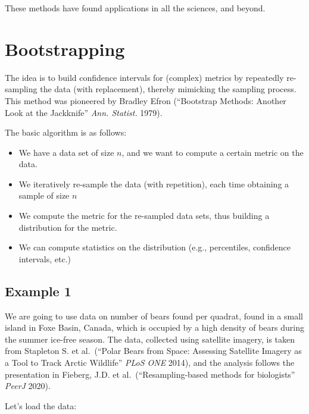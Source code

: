\documentclass[
  letterpaper,
  DIV=11,
  numbers=noendperiod]{scrreprt}
\newenvironment{Shaded}{\begin{snugshade}}{\end{snugshade}}
\newcommand{\NormalTok}[1]{\textcolor[rgb]{0.00,0.23,0.31}{#1}}
\providecommand{\tightlist}{%
  \setlength{\itemsep}{0pt}\setlength{\parskip}{0pt}}\usepackage{longtable,booktabs,array}
\begin{document}
These methods have found applications in all the sciences, and beyond.

\section{Bootstrapping}\label{bootstrapping}

The idea is to build confidence intervals for (complex) metrics by
repeatedly re-sampling the data (with replacement), thereby mimicking
the sampling process. This method was pioneered by Bradley Efron
(``Bootstrap Methods: Another Look at the Jackknife'' \emph{Ann.
Statist.} 1979).

The basic algorithm is as follows:

\begin{itemize}
\tightlist
\item
  We have a data set of size \(n\), and we want to compute a certain
  metric on the data.
\item
  We iteratively re-sample the data (with repetition), each time
  obtaining a sample of size \(n\)
\item
  We compute the metric for the re-sampled data sets, thus building a
  distribution for the metric.
\item
  We can compute statistics on the distribution (e.g., percentiles,
  confidence intervals, etc.)
\end{itemize}

\subsection{Example 1}\label{example-1}

We are going to use data on number of bears found per quadrat, found in
a small island in Foxe Basin, Canada, which is occupied by a high
density of bears during the summer ice-free season. The data, collected
using satellite imagery, is taken from Stapleton S. et al.~(``Polar
Bears from Space: Assessing Satellite Imagery as a Tool to Track Arctic
Wildlife'' \emph{PLoS ONE} 2014), and the analysis follows the
presentation in Fieberg, J.D. et al.~(``Resampling-based methods for
biologists'' \emph{PeerJ} 2020).

Let's load the data:

\begin{Shaded}
\end{Shaded}
\end{document}
